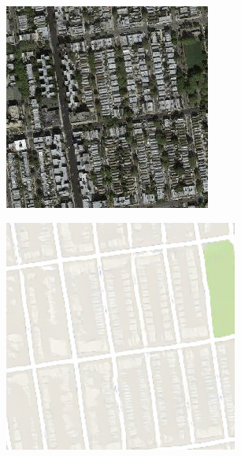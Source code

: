 \begin{figure}
	\medskip

	\begin{subfigure}[t]{.2\textwidth}
		\centering
		\includegraphics[width=\linewidth]{images/cycleGanResults/Satelite19_Or_Ld120_E100_Lr0002.jpg}
	  \end{subfigure}
	  \begin{subfigure}[t]{.2\textwidth}
		\centering
		\includegraphics[width=\linewidth]{images/Vergleich/p2.png}

\end{subfigure}
\end{figure}
